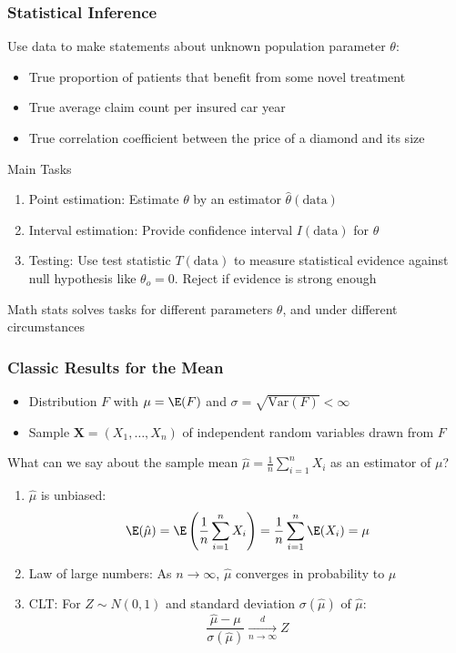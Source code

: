 \begin{frame}
	\frametitle{Statistical Inference}
	Use data to make statements about unknown population parameter $\theta$:
	\begin{itemize}
		\item True proportion of patients that benefit from some novel treatment
		\item True average claim count per insured car year
		\item True correlation coefficient between the price of a diamond and its size
	\end{itemize}
	
	\vfill
	
	\begin{block}{Main Tasks}
		\begin{enumerate}
			\item Point estimation: Estimate $\theta$ by an estimator $\hat \theta(\text{data})$
			\item Interval estimation: Provide confidence interval $I(\text{data})$ for $\theta$
			\item Testing: Use test statistic $T(\text{data})$ to measure statistical evidence against null hypothesis like $\theta_o = 0$. Reject if evidence is strong enough
		\end{enumerate}
	\end{block}
	
	Math stats solves tasks for different parameters $\theta$, and under different circumstances
\end{frame}

\begin{frame}
	\frametitle{Classic Results for the Mean}
	\begin{itemize}
		\item Distribution $F$ with $\mu = \E(F)$ and $\sigma = \sqrt{\text{Var}(F)} < \infty$
		\item Sample $\boldsymbol X = (X_1, \dots, X_n)$ of independent random variables drawn from $F$
	\end{itemize}
	
	\vfill
	
	\begin{block}{What can we say about the sample mean $\hat \mu = \frac{1}{n}\sum_{i = 1}^n X_i$ as an estimator of $\mu$?}
		\begin{enumerate}
			\item $\hat \mu$ is unbiased: 
			$$
			  \E(\hat \mu) = \E\left(\frac{1}{n}\sum_{i = 1}^n X_i\right) = \frac{1}{n}\sum_{i = 1}^n \E(X_i) = \mu
			$$
			\item Law of large numbers: As $n\to \infty$, $\hat\mu$ converges in probability to $\mu$
			\item CLT: For $Z\sim N(0, 1)$ and standard deviation $\sigma(\hat\mu)$ of $\hat\mu$:
			$$
			  \frac{\hat\mu - \mu}{\sigma(\hat\mu)} \xrightarrow[n\to \infty]{d} Z
			$$
		\end{enumerate}
	\end{block}
\end{frame}

